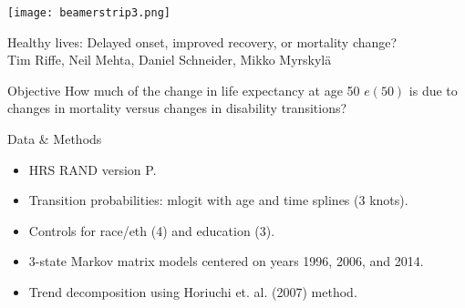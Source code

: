 \documentclass[20pt,usenames,dvipsnames]{beamer}
\begin{document}

\begin{frame}[plain]
	\vspace{-3cm}
 \centerline{\texttt{[image: beamerstrip3.png]}}

	
	\huge
	\vspace{1em}
	
	Healthy lives: Delayed onset, improved recovery, or mortality
change?\\
	\vspace{1em}
	\large 
	Tim Riffe, Neil Mehta, Daniel Schneider, Mikko Myrskyl\"a 
\end{frame}
\begin{frame}[plain]
\Large
\begin{block}{Objective}
How much of the change in life expectancy at age 50 $e(50)$ is due to changes in mortality versus changes in disability transitions?
\end{block}
\end{frame}
\begin{frame}[plain]
\Large
\begin{block}{Data \& Methods}
\begin{itemize}
\item HRS RAND version P. 
\item Transition probabilities: mlogit with age and time splines (3 knots).
\item Controls for race/eth (4) and education (3). 
\item 3-state Markov matrix models centered on years 1996, 2006, and 2014. 
\item Trend decomposition using Horiuchi et. al. (2007) method.
\end{itemize}
\end{block}
\end{frame}
\end{document}
